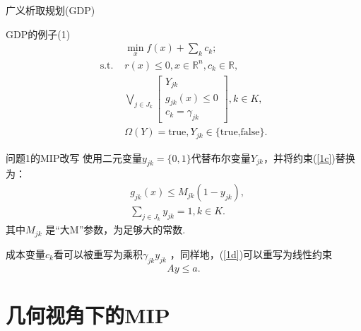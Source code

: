 \documentclass[notheorems,11pt]{beamer}
\theoremstyle{plain}
\numberwithin{theorem}{section}
\numberwithin{lemma}{section}
\numberwithin{corollary}{section}
\theoremstyle{example}
\begin{document}
\begin{frame}{广义析取规划(GDP)}
  \begin{exampleblock}{GDP的例子(1)}
    \begin{subequations}
    \begin{align}
      &\min_x{f(x)+\sum_k}{c_k} ;\\
      \text{s.t. } &r(x)\leqslant 0,x\in\mathbb{R}^n,c_k\in\mathbb{R} ,\\
      &\bigvee_{j\in J_k}\left[\begin{gathered}
        Y_{jk} \\
        g_{jk}(x)\leqslant 0 \\
        c_k=\gamma_{jk}
      \end{gathered}\right],k\in K, \label{1c}\\
      &\Omega(Y)=\text{true},Y_{jk}\in\{\text{true,false}\}. \label{1d}
    \end{align}
    \end{subequations}
  \end{exampleblock}
\end{frame}

\begin{frame}{问题1的MIP改写}
使用二元变量$y_{jk}=\{0,1\}$代替布尔变量$Y_{jk}$，并将约束(\ref{1c})替换为：
\begin{subequations}
\begin{align}
  &g_{jk}(x)\leqslant M_{jk}(1-y_{jk}),\\
  &\sum_{j\in J_k}{y_{jk}}=1,k\in K.
\end{align}
\end{subequations}
其中$M_{jk}$ 是“大M”参数，为足够大的常数.\par
成本变量$c_k$看可以被重写为乘积$\gamma_{jk}y_{jk}$ ，同样地，(\ref{1d})可以重写为线性约束
$$Ay\leqslant a.$$
\end{frame}


\section{几何视角下的MIP}
\end{document}
